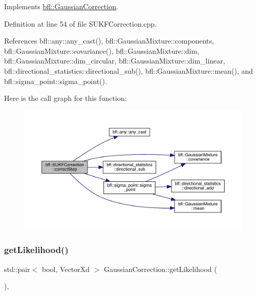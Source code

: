 Implements \mbox{\hyperlink{classbfl_1_1GaussianCorrection_af30322d949e8135e1ec243bd6df00c18}{bfl\+::\+Gaussian\+Correction}}.



Definition at line 54 of file S\+U\+K\+F\+Correction.\+cpp.



References bfl\+::any\+::any\+\_\+cast(), bfl\+::\+Gaussian\+Mixture\+::components, bfl\+::\+Gaussian\+Mixture\+::covariance(), bfl\+::\+Gaussian\+Mixture\+::dim, bfl\+::\+Gaussian\+Mixture\+::dim\+\_\+circular, bfl\+::\+Gaussian\+Mixture\+::dim\+\_\+linear, bfl\+::directional\+\_\+statistics\+::directional\+\_\+sub(), bfl\+::\+Gaussian\+Mixture\+::mean(), and bfl\+::sigma\+\_\+point\+::sigma\+\_\+point().

Here is the call graph for this function\+:
\nopagebreak
\begin{figure}[H]
\begin{center}
\leavevmode
\includegraphics[width=350pt]{classbfl_1_1SUKFCorrection_af58d64c5e6c1ef373df94e4c4179226b_cgraph}
\end{center}
\end{figure}
\mbox{\label{classbfl_1_1GaussianCorrection_a955702adbdad6448d8f306752d3d0868}} 
\subsubsection{\texorpdfstring{get\+Likelihood()}{getLikelihood()}}
{\footnotesize\ttfamily std\+::pair$<$ bool, Vector\+Xd $>$ Gaussian\+Correction\+::get\+Likelihood (\begin{DoxyParamCaption}{ }\end{DoxyParamCaption})\hspace{0.3cm}{\ttfamily [virtual]}, {\ttfamily [inherited]}}




